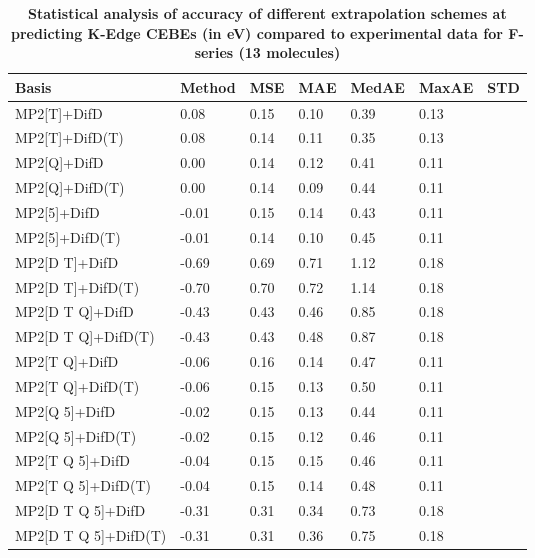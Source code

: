 \begin{table}
  \caption{\textbf{Statistical analysis of accuracy of different extrapolation schemes at predicting K-Edge CEBEs (in eV) compared to experimental data for F-series (13 molecules)}}
  \begin{tabular}{l l l l l l l }
    \toprule
    \textbf{Basis} & \textbf{Method} & \textbf{MSE} & \textbf{MAE} & \textbf{MedAE} & \textbf{MaxAE} & \textbf{STD} \\ 
    \midrule
    MP2[T]+DifD & 0.08 & 0.15 & 0.10 & 0.39 & 0.13 \\ 
    MP2[T]+DifD(T) & 0.08 & 0.14 & 0.11 & 0.35 & 0.13 \\ 
    MP2[Q]+DifD & 0.00 & 0.14 & 0.12 & 0.41 & 0.11 \\ 
    MP2[Q]+DifD(T) & 0.00 & 0.14 & 0.09 & 0.44 & 0.11 \\ 
    MP2[5]+DifD & -0.01 & 0.15 & 0.14 & 0.43 & 0.11 \\ 
    MP2[5]+DifD(T) & -0.01 & 0.14 & 0.10 & 0.45 & 0.11 \\ 
    MP2[D T]+DifD & -0.69 & 0.69 & 0.71 & 1.12 & 0.18 \\ 
    MP2[D T]+DifD(T) & -0.70 & 0.70 & 0.72 & 1.14 & 0.18 \\ 
    MP2[D T Q]+DifD & -0.43 & 0.43 & 0.46 & 0.85 & 0.18 \\ 
    MP2[D T Q]+DifD(T) & -0.43 & 0.43 & 0.48 & 0.87 & 0.18 \\ 
    MP2[T Q]+DifD & -0.06 & 0.16 & 0.14 & 0.47 & 0.11 \\ 
    MP2[T Q]+DifD(T) & -0.06 & 0.15 & 0.13 & 0.50 & 0.11 \\ 
    MP2[Q 5]+DifD & -0.02 & 0.15 & 0.13 & 0.44 & 0.11 \\ 
    MP2[Q 5]+DifD(T) & -0.02 & 0.15 & 0.12 & 0.46 & 0.11 \\ 
    MP2[T Q 5]+DifD & -0.04 & 0.15 & 0.15 & 0.46 & 0.11 \\ 
    MP2[T Q 5]+DifD(T) & -0.04 & 0.15 & 0.14 & 0.48 & 0.11 \\ 
    MP2[D T Q 5]+DifD & -0.31 & 0.31 & 0.34 & 0.73 & 0.18 \\ 
    MP2[D T Q 5]+DifD(T) & -0.31 & 0.31 & 0.36 & 0.75 & 0.18 \\ 
    \bottomrule
  \end{tabular}
\end{table}
